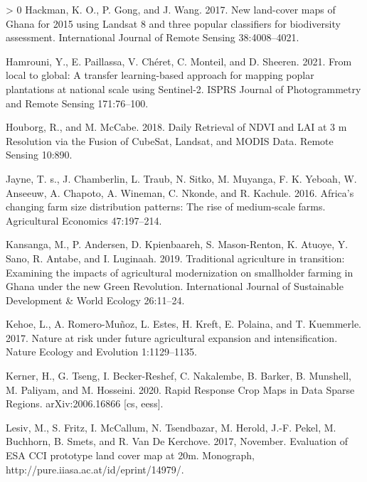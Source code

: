 \documentclass[11pt,a4paper]{article}
\newlength{\cslhangindent}
\newenvironment{CSLReferences}[3] %
 {%
  \setlength{\parindent}{0pt}
  \ifodd #1 \everypar{\setlength{\hangindent}{\cslhangindent}}\ignorespaces\fi
  \ifnum #2 > 0
  \setlength{\parskip}{#2\baselineskip}
  \fi
 }%
 {}
\begin{document}
\begin{CSLReferences}{1}{0}
\leavevmode\hypertarget{ref-hackmanNewLandcoverMaps2017}{}%
Hackman, K. O., P. Gong, and J. Wang. 2017. New land-cover maps of
{Ghana} for 2015 using {Landsat} 8 and three popular classifiers for
biodiversity assessment. International Journal of Remote Sensing
38:4008--4021.

\leavevmode\hypertarget{ref-hamrouniLocalGlobalTransfer2021}{}%
Hamrouni, Y., E. Paillassa, V. Chéret, C. Monteil, and D. Sheeren. 2021.
From local to global: {A} transfer learning-based approach for mapping
poplar plantations at national scale using {Sentinel}-2. ISPRS Journal
of Photogrammetry and Remote Sensing 171:76--100.

\leavevmode\hypertarget{ref-HouborgDailyRetrievalNDVI2018}{}%
Houborg, R., and M. McCabe. 2018. Daily {Retrieval} of {NDVI} and {LAI}
at 3 m {Resolution} via the {Fusion} of {CubeSat}, {Landsat}, and {MODIS
Data}. Remote Sensing 10:890.

\leavevmode\hypertarget{ref-jayneAfricaChangingFarm2016}{}%
Jayne, T. s., J. Chamberlin, L. Traub, N. Sitko, M. Muyanga, F. K.
Yeboah, W. Anseeuw, A. Chapoto, A. Wineman, C. Nkonde, and R. Kachule.
2016. Africa's changing farm size distribution patterns: The rise of
medium-scale farms. Agricultural Economics 47:197--214.

\leavevmode\hypertarget{ref-KansangaTraditionalagriculturetransition2019}{}%
Kansanga, M., P. Andersen, D. Kpienbaareh, S. Mason-Renton, K. Atuoye,
Y. Sano, R. Antabe, and I. Luginaah. 2019. Traditional agriculture in
transition: Examining the impacts of agricultural modernization on
smallholder farming in {Ghana} under the new {Green Revolution}.
International Journal of Sustainable Development \& World Ecology
26:11--24.

\leavevmode\hypertarget{ref-kehoeNatureRiskFuture2017}{}%
Kehoe, L., A. Romero-Muñoz, L. Estes, H. Kreft, E. Polaina, and T.
Kuemmerle. 2017. Nature at risk under future agricultural expansion and
intensification. Nature Ecology and Evolution 1:1129--1135.

\leavevmode\hypertarget{ref-kernerRapidResponseCrop2020}{}%
Kerner, H., G. Tseng, I. Becker-Reshef, C. Nakalembe, B. Barker, B.
Munshell, M. Paliyam, and M. Hosseini. 2020. Rapid {Response Crop Maps}
in {Data Sparse Regions}. arXiv:2006.16866 {[}cs, eess{]}.

\leavevmode\hypertarget{ref-LesivEvaluationESACCI2017}{}%
Lesiv, M., S. Fritz, I. McCallum, N. Tsendbazar, M. Herold, J.-F. Pekel,
M. Buchhorn, B. Smets, and R. Van De Kerchove. 2017, November.
Evaluation of {ESA CCI} prototype land cover map at 20m. Monograph,
http://pure.iiasa.ac.at/id/eprint/14979/.


\end{CSLReferences}
\end{document}
